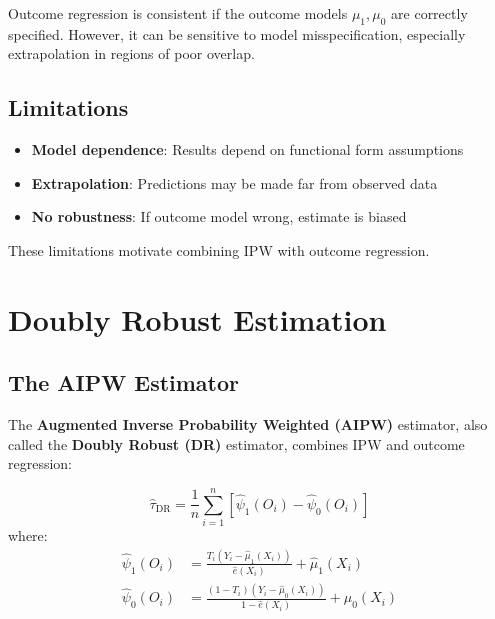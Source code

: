 Outcome regression is consistent if the outcome models $\mu_1, \mu_0$ are correctly specified. However, it can be sensitive to model misspecification, especially extrapolation in regions of poor overlap.

\subsection{Limitations}

\begin{itemize}
    \item \textbf{Model dependence}: Results depend on functional form assumptions
    \item \textbf{Extrapolation}: Predictions may be made far from observed data
    \item \textbf{No robustness}: If outcome model wrong, estimate is biased
\end{itemize}

These limitations motivate combining IPW with outcome regression.

\section{Doubly Robust Estimation}
\label{sec:doubly_robust}

\subsection{The AIPW Estimator}

The \textbf{Augmented Inverse Probability Weighted (AIPW)} estimator, also called the \textbf{Doubly Robust (DR)} estimator, combines IPW and outcome regression:

\begin{definition}
\label{def:dr}
\begin{equation}
\hat{\tau}_{\text{DR}} = \frac{1}{n}\sum_{i=1}^{n} \left[ \hat{\psi}_1(O_i) - \hat{\psi}_0(O_i) \right]
\end{equation}
where:
\begin{align}
\hat{\psi}_1(O_i) &= \frac{T_i (Y_i - \hat{\mu}_1(X_i))}{\hat{e}(X_i)} + \hat{\mu}_1(X_i) \\[1ex]
\hat{\psi}_0(O_i) &= \frac{(1-T_i) (Y_i - \hat{\mu}_0(X_i))}{1 - \hat{e}(X_i)} + \hat{\mu}_0(X_i)
\end{align}
\end{definition}

